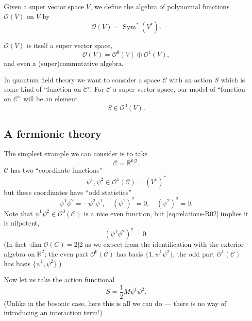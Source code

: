 \documentclass[12pt,letterpaper,reqno]{article}
\numberwithin{equation}{section}
\newcommand{\cC}{\ensuremath{\mathcal C}}
\newcommand{\cO}{\ensuremath{\mathcal O}}
\newcommand{\R}{\ensuremath{\mathbb R}}
\newcommand{\half}{\ensuremath{\frac{1}{2}}}
\DeclareMathOperator{\Sym}{Sym}
\begin{document}
\begin{defn}
Given a super vector space $V$, 
we define the algebra of polynomial functions $\cO(V)$ on $V$
by
\begin{equation}
  \cO(V) = \Sym^* (V^*).
\end{equation}
\end{defn}

$\cO(V)$ is itself a super vector space,
\begin{equation}
  \cO(V) = \cO^0(V) \oplus \cO^1(V),
\end{equation}
and even a (super)commutative algebra.

In quantum field theory we want to consider a space $\cC$ 
with an action $S$ which is some kind of ``function on $\cC$''. 
For $\cC$ a super vector space, our model of ``function on $\cC$''
will be an element
\begin{equation}
S \in \cO^0(V).
\end{equation}


\subsection{A fermionic theory}

The simplest example we can consider is to take
\begin{equation}
  \cC = \R^{0 \vert 2}.
\end{equation}
$\cC$ has two ``coordinate functions''
\begin{equation}
  \psi^1, \psi^2 \in \cO^1(\cC) = (V^1)^*
\end{equation}
but these coordinates have ``odd statistics''
\begin{equation} \label{eq:relations-R02}
  \psi^1 \psi^2 = -\psi^2 \psi^1, \quad (\psi^1)^2 = 0, \quad (\psi^2)^2 = 0.
\end{equation}
Note that $\psi^1 \psi^2 \in \cO^0(\cC)$ is a nice even function,
but \eqref{eq:relations-R02} implies it is nilpotent,
\begin{equation}
  (\psi^1 \psi^2)^2 = 0.
\end{equation}
(In fact $\dim \cO(C) = 2 \vert 2$ as we expect from the identification
with the exterior algebra on $\R^2$; the even part $\cO^0(\cC)$ has basis
$\{1, \psi^1 \psi^2\}$, the odd part $\cO^1(\cC)$ has basis $\{\psi^1, \psi^2\}$.)

Now let us take the action functional
\begin{equation}
  S = \half M \psi^1 \psi^2.
\end{equation}
(Unlike in the bosonic case, here this is all we can do --- there is no 
way of introducing an interaction term!)
\end{document}
